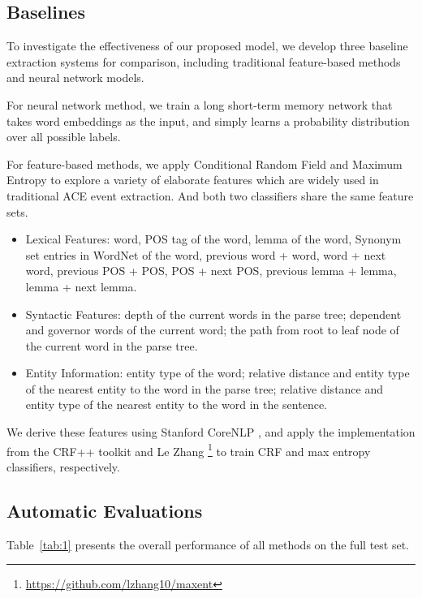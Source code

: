 \documentclass{article}
\begin{document}
\subsection{Baselines}
To investigate the effectiveness of our proposed model, we develop three baseline extraction systems for comparison, including traditional feature-based methods and neural network models. 

For neural network method, we train a long short-term memory network that takes word embeddings as the input, and simply learns a probability distribution over all possible labels.

For feature-based methods, we apply Conditional Random Field \cite{lafferty2001conditional} and Maximum Entropy \cite{berger1996maximum} to explore a variety of elaborate features which are widely used in traditional ACE event extraction. And both two classifiers share the same feature sets.

\begin{itemize}
	\item Lexical Features: word, POS tag of the word, lemma of the word, Synonym set entries in WordNet \cite{miller1995wordnet} of the word, previous word + word, word + next word, previous POS + POS, POS + next POS, previous lemma + lemma, lemma + next lemma.
	\item Syntactic Features: depth of the current words in the parse tree; dependent and governor words of the current word; the path from root to leaf node of the current word in the parse tree.
	\item Entity Information: entity type of the word; relative distance and entity type of the nearest entity to the word in the parse tree; relative distance and entity type of the nearest entity to the word in the sentence.
\end{itemize}

We derive these features using Stanford CoreNLP \cite{manning2014stanford}, and apply the implementation from the CRF++ toolkit \cite{kudo2005crf++} and Le Zhang \footnote{\url{https://github.com/lzhang10/maxent}} to train CRF and max entropy classifiers, respectively.

\subsection{Automatic Evaluations}
Table~\ref{tab:1} presents the overall performance of all methods on the full test set. 
\end{document}
